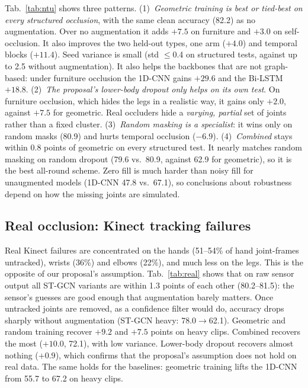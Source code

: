 \documentclass[11pt,twocolumn,letterpaper]{article}
\begin{document}
Tab.~\ref{tab:ntu} shows three patterns.
(1)~\emph{Geometric training is best or tied-best on every structured occlusion}, with the same clean accuracy (82.2) as no augmentation.
Over no augmentation it adds $+7.5$ on furniture and $+3.0$ on self-occlusion.
It also improves the two held-out types, one arm ($+4.0$) and temporal blocks ($+11.4$).
Seed variance is small (std $\leq$0.4 on structured tests, against up to 2.5 without augmentation).
It also helps the backbones that are not graph-based: under furniture occlusion the 1D-CNN gains $+29.6$ and the Bi-LSTM $+18.8$.
(2)~\emph{The proposal's lower-body dropout only helps on its own test}.
On furniture occlusion, which hides the legs in a realistic way, it gains only $+2.0$, against $+7.5$ for geometric.
Real occluders hide a \emph{varying, partial} set of joints rather than a fixed cluster.
(3)~\emph{Random masking is a specialist}: it wins only on random masks (80.9) and hurts temporal occlusion ($-6.9$).
(4)~\emph{Combined} stays within 0.8 points of geometric on every structured test.
It nearly matches random masking on random dropout (79.6 vs.\ 80.9, against 62.9 for geometric), so it is the best all-round scheme.
Zero fill is much harder than noisy fill for unaugmented models (1D-CNN 47.8 vs.\ 67.1), so conclusions about robustness depend on how the missing joints are simulated.

\subsection{Real occlusion: Kinect tracking failures}
\begin{table}[t]
\centering\footnotesize
\setlength{\tabcolsep}{2.5pt}
\resizebox{\linewidth}{!}{}
\caption{Top-1 accuracy (\%) on NTU-Real (6{,}043 clips; \emph{heavy}: 2{,}139 clips with $\geq$20\% untracked joints).
\emph{Kinect}: raw sensor output. \emph{Dropped}: untracked joints zeroed. ST-GCN: mean$\pm$std over 3 seeds.}
\label{tab:real}
\end{table}

Real Kinect failures are concentrated on the hands (51--54\% of hand joint-frames untracked), wrists (36\%) and elbows (22\%), and much less on the legs.
This is the opposite of our proposal's assumption.
Tab.~\ref{tab:real} shows that on raw sensor output all ST-GCN variants are within 1.3 points of each other (80.2--81.5): the sensor's guesses are good enough that augmentation barely matters.
Once untracked joints are removed, as a confidence filter would do, accuracy drops sharply without augmentation (ST-GCN heavy: 78.0$\rightarrow$62.1).
Geometric and random training recover $+9.2$ and $+7.5$ points on heavy clips.
Combined recovers the most ($+10.0$, 72.1), with low variance.
Lower-body dropout recovers almost nothing ($+0.9$), which confirms that the proposal's assumption does not hold on real data.
The same holds for the baselines: geometric training lifts the 1D-CNN from 55.7 to 67.2 on heavy clips.
\end{document}
